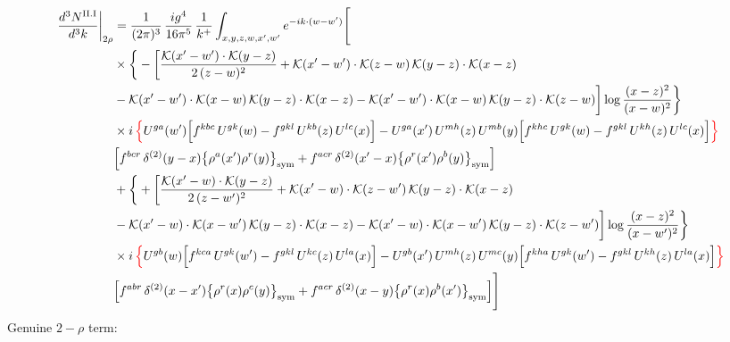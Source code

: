 \documentclass[9pt]{article}
\numberwithin{equation}{section}
\begin{document}
\begin{align}
\frac{d^{3}N^{\rm II.I}}{d^{3}k}\bigg|_{2\rho}&=\frac{1}{(2\pi)^{3}}\,\frac{ig^{4}}{16\pi^{5}}\,\frac{1}{k^{+}}\int_{x,y,z,w,x',w'}e^{-ik\cdot{(w-w')}}\Bigg[\notag\\
&\times\bigg\{-\bigg[\frac{\mathcal{K}(x'-w')\cdot\mathcal{K}(y-z)}{2\,(z-w)^{2}}+\mathcal{K}(x'-w')\cdot\mathcal{K}(z-w)\,\mathcal{K}(y-z)\cdot\mathcal{K}(x-z)\notag\\
&-\mathcal{K}(x'-w')\cdot\mathcal{K}(x-w)\,\mathcal{K}(y-z)\cdot\mathcal{K}(x-z)-\mathcal{K}(x'-w')\cdot\mathcal{K}(x-w)\,\mathcal{K}(y-z)\cdot\mathcal{K}(z-w)\bigg]\log\frac{(x-z)^{2}}{(x-w)^{2}}\bigg\}\notag\\
&\times i\,{\color{red}\Big\{}U^{ga}(w')\Big[f^{kbc}\,U^{gk}(w)-f^{gkl}\,U^{kb}(z)\,U^{lc}(x)\Big]-U^{ga}(x')\,U^{mh}(z)\,U^{mb}(y)\Big[f^{khc}\,U^{gk}(w)-f^{gkl}\,U^{kh}(z)\,U^{lc}(x)\Big]{\color{red}\Big\}}\notag \\ & \Big[f^{bcr}\,\delta^{(2)}(y-x)\big\{\rho^{a}(x')\rho^{r}(y)\big\}_{\rm sym} +f^{acr}\,\delta^{(2)}(x'-x)\big\{\rho^{r}(x')\rho^{b}(y)\big\}_{\rm sym}\Big]\notag\\
&+\bigg\{+\bigg[\frac{\mathcal{K}(x'-w)\cdot\mathcal{K}(y-z)}{2\,(z-w')^{2}}+\mathcal{K}(x'-w)\cdot\mathcal{K}(z-w')\,\mathcal{K}(y-z)\cdot\mathcal{K}(x-z)\notag\\
&-\mathcal{K}(x'-w)\cdot\mathcal{K}(x-w')\,\mathcal{K}(y-z)\cdot\mathcal{K}(x-z)-\mathcal{K}(x'-w)\cdot\mathcal{K}(x-w')\,\mathcal{K}(y-z)\cdot\mathcal{K}(z-w')\bigg]\log\frac{(x-z)^{2}}{(x-w')^{2}}\bigg\}\notag\\
&\times i\,{\color{red}\Big\{}U^{gb}(w)\Big[f^{kca}\,U^{gk}(w')-f^{gkl}\,U^{kc}(z)\,U^{la}(x)\Big]-U^{gb}(x')\,U^{mh}(z)\,U^{mc}(y)\Big[f^{kha}\,U^{gk}(w')-f^{gkl}\,U^{kh}(z)\,U^{la}(x)\Big]{\color{red}\Big\}}\notag \\ & \Big[f^{abr}\,\delta^{(2)}(x-x')\big\{\rho^{r}(x)\rho^{c}(y)\big\}_{\rm sym} +f^{acr}\,\delta^{(2)}(x-y)\big\{\rho^{r}(x)\rho^{b}(x')\big\}_{\rm sym}\Big]\Bigg]\label{eq:D-II.I-2}
\end{align}
Genuine $2-\rho$ term:
\end{document}
